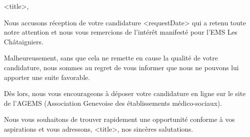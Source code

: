 
<title>,

Nous accusons réception de votre candidature <requestDate> qui a retenu toute notre attention et nous vous remercions de l’intérêt manifesté pour l’EMS Les Châtaigniers.

Malheureusement, sans que cela ne remette en cause la qualité de votre candidature, nous sommes au regret de vous informer que nous ne pouvons lui apporter une suite favorable.

Dès lors, nous vous encourageons à déposer votre candidature en ligne sur le site de l’AGEMS (Association Genevoise des établissements médico-sociaux).

Nous vous souhaitons de trouver rapidement une opportunité conforme à vos aspirations et vous adressons, <title>, nos sincères salutations.



